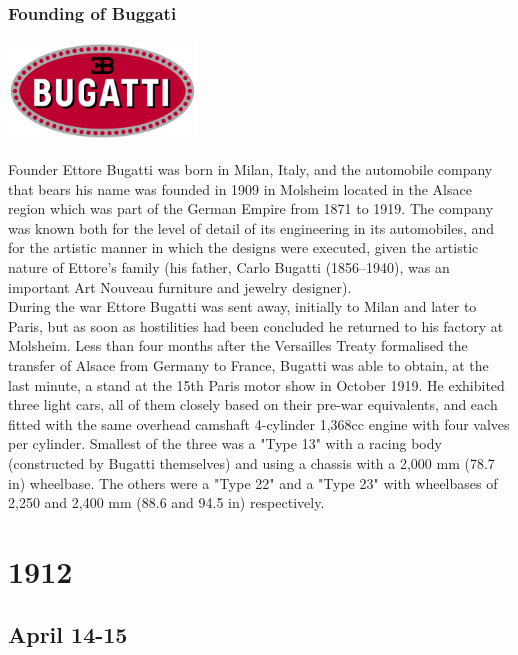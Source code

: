 \documentclass[11pt]{report}
\begin{document}
\subsection{Founding of Buggati}
\vspace{2mm}\begin{center}\includegraphics[width=5cm]{./img/bugattiLogo.jpg}\end{center}
Founder Ettore Bugatti was born in Milan, Italy, and the automobile company that bears his name was founded in 1909 in Molsheim located in the Alsace region which was part of the German Empire from 1871 to 1919. The company was known both for the level of detail of its engineering in its automobiles, and for the artistic manner in which the designs were executed, given the artistic nature of Ettore's family (his father, Carlo Bugatti (1856–1940), was an important Art Nouveau furniture and jewelry designer).\\ \indent During the war Ettore Bugatti was sent away, initially to Milan and later to Paris, but as soon as hostilities had been concluded he returned to his factory at Molsheim. Less than four months after the Versailles Treaty formalised the transfer of Alsace from Germany to France, Bugatti was able to obtain, at the last minute, a stand at the 15th Paris motor show in October 1919. He exhibited three light cars, all of them closely based on their pre-war equivalents, and each fitted with the same overhead camshaft 4-cylinder 1,368cc engine with four valves per cylinder. Smallest of the three was a "Type 13" with a racing body (constructed by Bugatti themselves) and using a chassis with a 2,000 mm (78.7 in) wheelbase. The others were a "Type 22" and a "Type 23" with wheelbases of 2,250 and 2,400 mm (88.6 and 94.5 in) respectively.

\chapter{1912}
\section{April 14-15}
\end{document}
